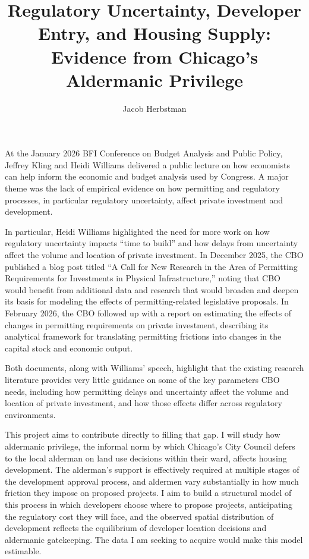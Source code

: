 \documentclass[12pt]{article}
\title{Regulatory Uncertainty, Developer Entry, and Housing Supply: Evidence from Chicago's Aldermanic Privilege}
\author{Jacob Herbstman}
\begin{document}
\maketitle

At the January 2026 BFI Conference on Budget Analysis and Public Policy, Jeffrey Kling and Heidi Williams delivered a public lecture on how economists can help inform the economic and budget analysis used by Congress. A major theme was the lack of empirical evidence on how permitting and regulatory processes, in particular regulatory uncertainty, affect private investment and development. 

In particular, Heidi Williams highlighted the need for more work on how regulatory uncertainty impacts ``time to build'' and how delays from uncertainty affect the volume and location of private investment.
In December 2025, the CBO published a blog post titled ``A Call for New Research in the Area of Permitting Requirements for Investments in Physical Infrastructure,'' noting that CBO would benefit from additional data and research that would broaden and deepen its basis for modeling the effects of permitting-related legislative proposals. 
In February 2026, the CBO followed up with a report on estimating the effects of changes in permitting requirements on private investment, describing its analytical framework for translating permitting frictions into changes in the capital stock and economic output.

Both documents, along with Williams' speech, highlight that the existing research literature provides very little guidance on some of the key parameters CBO needs, including how permitting delays and uncertainty affect the volume and location of private investment, and how those effects differ across regulatory environments.

This project aims to contribute directly to filling that gap. I will study how aldermanic privilege, the informal norm by which Chicago's City Council defers to the local alderman on land use decisions within their ward, affects housing development. The alderman's support is effectively required at multiple stages of the development approval process, and aldermen vary substantially in how much friction they impose on proposed projects. I aim to build a structural model of this process in which developers choose where to propose projects, anticipating the regulatory cost they will face, and the observed spatial distribution of development reflects the equilibrium of developer location decisions and aldermanic gatekeeping. The data I am seeking to acquire would make this model estimable.
\end{document}
